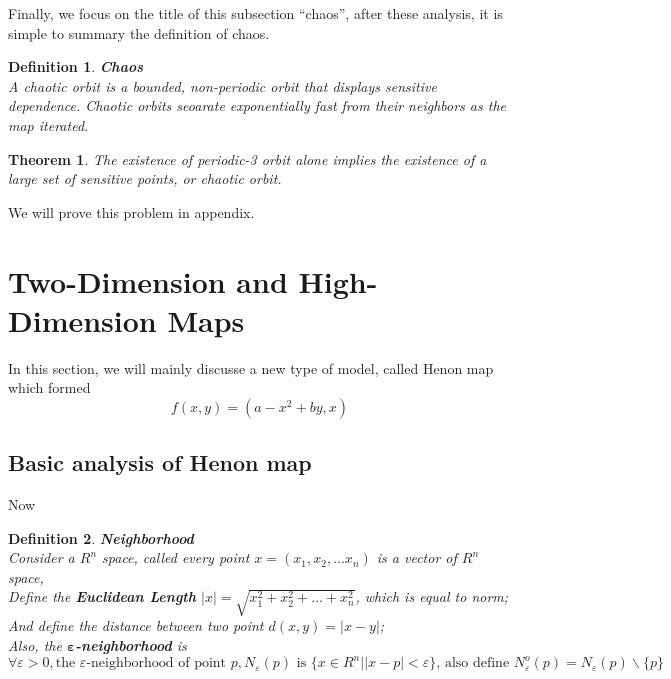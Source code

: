 \documentclass[12pt]{article}
\theoremstyle{plain}
\newtheorem{theorem}{\textbf{Theorem}}[section]
\newtheorem{definition}{\textbf{Definition}}[section]
\begin{document}
Finally, we focus on the title of this subsection ``chaos'', after these analysis, it is simple to summary the definition of chaos.

\begin{definition}\textbf{Chaos}
\\\noindent A chaotic orbit is a bounded, non-periodic orbit that displays sensitive dependence. Chaotic orbits seoarate exponentially fast from their neighbors as the map iterated.
\end{definition}


\begin{theorem} \label{p3-chaos}The existence of periodic-3 orbit alone implies the existence of a large set of sensitive points, or chaotic orbit.
\end{theorem}

We will prove this problem in appendix.

\newpage















\section{Two-Dimension and High-Dimension Maps}

In this section, we will mainly discusse a new type of model, called Henon map which formed
$$
f(x, y) = (a - x^2 + by, x) 
$$

\subsection{Basic analysis of Henon map}
Now 



\begin{definition}\textbf{Neighborhood}
\\\noindent Consider a $R^n$ space, called every point $x = (x_1, x_2, \ldots x_n)$ is a vector of $R^n$ space,
\\\noindent Define the \textbf{Euclidean Length} $|x| = \sqrt{x_1^2 + x_2^2 + \ldots + x_n^2}$, which is equal to norm;
\\\noindent And define the distance between two point $d(x, y) = |x - y|$;
\\\noindent Also, the \textbf{$\mathbf{\varepsilon}$-neighborhood} is 
$$
\forall \varepsilon > 0, \text{the }\varepsilon \text{-neighborhood of point }p, N_\varepsilon(p) \text{ is } \{x\in R^n | |x - p| < \varepsilon\} \text{, also define }N_\varepsilon^o(p) = N_\varepsilon(p)\backslash\{p\}
$$
\end{definition}
\end{document}
